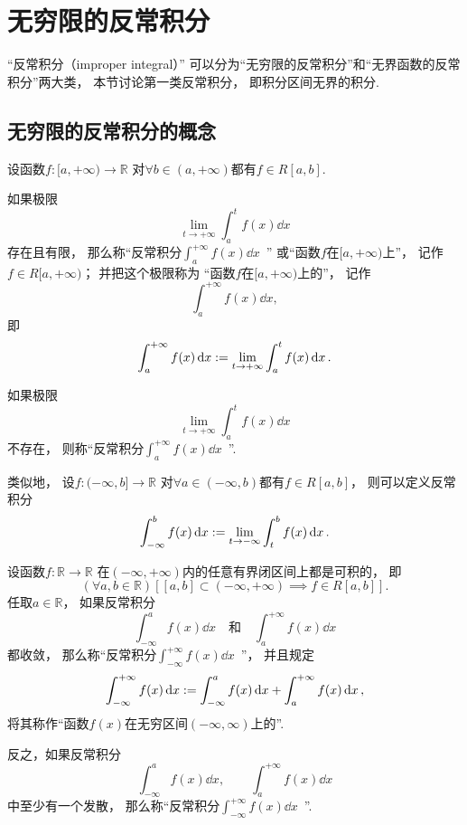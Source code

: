 \section{无穷限的反常积分}
“反常积分（improper integral）”
可以分为“无穷限的反常积分”和“无界函数的反常积分”两大类，
本节讨论第一类反常积分，
即积分区间无界的积分.

\subsection{无穷限的反常积分的概念}
\begin{definition}\label{definition:定积分.无穷限的反常积分的定义1}
设函数\(f\colon[a,+\infty)\to\mathbb{R}\)
对\(\forall b\in(a,+\infty)\)都有\(f \in R[a,b]\).

如果极限\[
	\lim_{t \to +\infty} \int_a^t f(x) \dd{x}
\]存在且有限，
那么称“反常积分\(\int_a^{+\infty} f(x) \dd{x}\)~”
或“函数\(f\)在\([a,+\infty)\)上”，
记作\(f \in R[a,+\infty)\)；
并把这个极限称为
“函数\(f\)在\([a,+\infty)\)上的”，
记作\[
	\int_a^{+\infty} f(x) \dd{x},
\]
即\[
	\int_a^{+\infty} f(x) \dd{x}
	:=
	\lim_{t \to +\infty} \int_a^t f(x) \dd{x}.
\]

如果极限\[
	\lim_{t \to +\infty} \int_a^t f(x) \dd{x}
\]不存在，
则称“反常积分\(\int_a^{+\infty} f(x) \dd{x}\)~”.
\end{definition}

类似地，
设\(f\colon(-\infty,b]\to\mathbb{R}\)
对\(\forall a\in(-\infty,b)\)都有\(f \in R[a,b]\)，
则可以定义反常积分\[
	\int_{-\infty}^b f(x) \dd{x}
	:=
	\lim_{t \to -\infty} \int_t^b f(x) \dd{x}.
\]

\begin{definition}\label{definition:定积分.无穷限的反常积分的定义3}
设函数\(f\colon\mathbb{R}\to\mathbb{R}\)
在\((-\infty,+\infty)\)内的任意有界闭区间上都是可积的，
即\[
	(\forall a,b\in\mathbb{R})
	[
		[a,b]\subset(-\infty,+\infty)
		\implies
		f \in R[a,b]
	].
\]
任取\(a\in\mathbb{R}\)，
如果反常积分\[
	\int_{-\infty}^a f(x) \dd{x}
	\quad\text{和}\quad
	\int_a^{+\infty} f(x) \dd{x}
\]都收敛，
那么称“反常积分\(\int_{-\infty}^{+\infty} f(x) \dd{x}\)~”，
并且规定\[
	\int_{-\infty}^{+\infty} f(x) \dd{x}
	:=
	\int_{-\infty}^a f(x) \dd{x} + \int_a^{+\infty} f(x) \dd{x},
\]
将其称作“函数\(f(x)\)在无穷区间\((-\infty,\infty)\)上的”.

反之，如果反常积分\[
	\int_{-\infty}^a f(x) \dd{x}, \qquad
	\int_a^{+\infty} f(x) \dd{x}
\]中至少有一个发散，
那么称“反常积分\(\int_{-\infty}^{+\infty} f(x) \dd{x}\)~”.
\end{definition}

